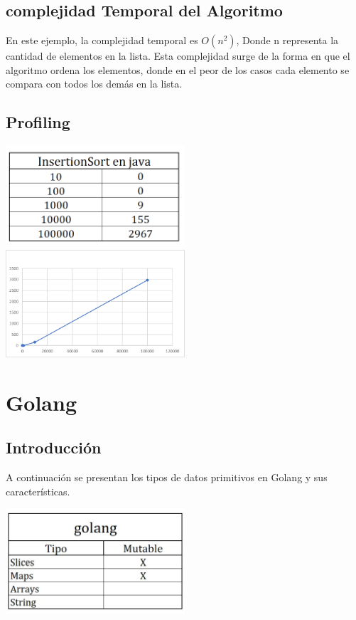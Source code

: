 \documentclass{article}
\begin{document}
\subsection{complejidad Temporal del Algoritmo}
En este ejemplo, la complejidad temporal es \( O(n^2)\), Donde n representa la cantidad de elementos en la lista. Esta complejidad surge de la forma en que el algoritmo ordena los elementos, donde en el peor de los casos cada elemento se compara con todos los demás en la lista.

\subsection{Profiling}
\includegraphics[width=0.5\textwidth]{vsjavaTabla.png}
\includegraphics[width=0.5\textwidth]{javaGrafica.png}

\section{Golang}
\subsection{Introducción}
A continuación se presentan los tipos de datos primitivos en Golang y sus características.

\includegraphics[width=0.5\textwidth]{golangTabla.jpg}
\end{document}
